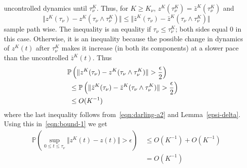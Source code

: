 \documentclass[10pt,journal,letterpaper]{IEEEtran}
\begin{document}
\begin{inparaenum}[(a)]
uncontrolled dynamics until $\tau^K_{\nu}$. Thus, for $K \geq
K_{\nu}$, $z^K(\tau^K_{\nu}) = \bar{z}^K(\tau^K_{\nu})$ and
\[\Vert z^K(\tau_{\nu}) - z^K(\tau_{\nu}
 \wedge \tau^K_{\nu}) \Vert \leq \Vert \bar{z}^K(\tau_{\nu}) - \bar{z}^K(\tau_{\nu}
 \wedge \tau^K_{\nu}) \Vert \]
sample path wise. The inequality is an equality if $\tau_{\nu} \leq
\tau_{\nu}^K$;  both sides equal $0$ in this case. Otherwise, it is
an inequality because the possible change in dynamics of $z^K(t)$
after $\tau^K_{\nu}$ makes it increase (in both its components) at a
slower pace than the uncontrolled $\bar{z}^K(t)$. Thus
\begin{align*}
\lefteqn{\mathbb{P}\left(\Vert z^K(\tau_{\nu}) - z^K(\tau_{\nu}
 \wedge \tau^K_{\nu}) \Vert > \frac{\epsilon}{2} \right)} \\
&~\leq \mathbb{P}\left(\Vert \bar{z}^K(\tau_{\nu}) -
\bar{z}^K(\tau_{\nu}
 \wedge \tau^K_{\nu}) \Vert > \frac{\epsilon}{2} \right) \\
&~ \leq O(K^{-1})
\end{align*}
where the last inequality follows from~\eqref{eqn:darling-a2} and
Lemma~\ref{epsi-delta}. Using this in~\eqref{eqn:bound-1} we get
\begin{align*}
\mathbb{P}\left(\sup_{0 \leq t \leq \tau_{\nu}} \Vert z^K(t)- z(t)
\Vert > \epsilon \right) &~\leq O(K^{-1}) + O(K^{-1}) \\
&~ = O(K^{-1})
\end{align*}


\end{inparaenum}
\end{document}
